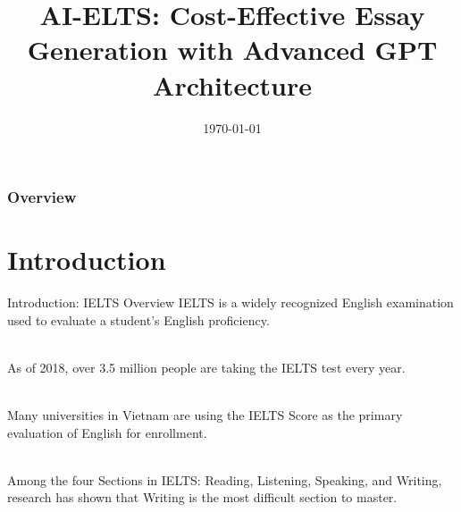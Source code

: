 \documentclass[10pt]{beamer}
\title[AI-ELTS]{AI-ELTS: Cost-Effective Essay Generation with Advanced GPT Architecture} %
\author[] {{An Dinh Ngoc} \and {Phuc Phan Van} \and {Hoa Dam Nguyen Quynh} \and {Van Nguyen Phuc} \and {Thanh Nguyen Phuoc} \\
{\and} \\
{\textit{Supervisors}} \\
{Hieu Tang Quang}
}
\institute[FPT University]{FPT University} %
{
\institute \\ %
}
\date{\today} %
\begin{document}
\frame{\titlepage}

\begin{frame}
\frametitle{Overview} %
\tableofcontents %
\end{frame}


\section{Introduction} %



\begin{frame}{Introduction: IELTS Overview}
IELTS is a widely recognized English examination used to evaluate a student's English proficiency.\\~\\
\pause

As of 2018, over 3.5 million people are taking the IELTS test every year.  \\~\\
\pause

Many universities in Vietnam are using the IELTS Score as the primary evaluation of English for enrollment.\\~\\
\pause

Among the four Sections in IELTS: Reading, Listening, Speaking, and Writing, research has shown that \alert{Writing} is the most difficult section to master. \\~\\
\end{frame}
\end{document}
